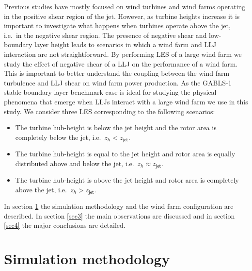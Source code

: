 \documentclass[%
 aip,
 amsmath,amssymb,
preprint,%
author-numerical,%
]{revtex4-1}
\begin{document}
Previous studies have mostly focused on wind turbines and wind farms operating in the positive shear region of the jet. However, as turbine heights increase it is important to investigate what happens when turbines operate above the jet, i.e.\ in the negative shear region. The presence of negative shear and low-boundary layer height leads to scenarios in which a wind farm and LLJ interaction are not straightforward. By performing LES of a large wind farm we study the effect of negative shear of a LLJ on the performance of a wind farm. This is important to better understand the coupling between the wind farm turbulence and LLJ shear on wind farm power production. As the GABLS-1 stable boundary layer benchmark case is ideal for studying the physical phenomena that emerge when LLJs interact with a large wind farm we use in this study. We consider three LES corresponding to the following scenarios:
\vspace{-2.5mm}
\begin{itemize}
\item[1.] The turbine hub-height is below the jet height and the rotor area is completely below the jet, i.e.\ $z_h < z_\mathsf{jet}$.
\vspace{-2.5mm}
\item[2.] The turbine hub-height is equal to the jet height and rotor area is equally distributed above and below the jet, i.e.\ $z_h \approx z_\mathsf{jet}$.
\vspace{-2.5mm}
\item[3.] The turbine hub-height is above the jet height and rotor area is completely above the jet, i.e.\ $z_h > z_\mathsf{jet}$.
\end{itemize}
In section \ref{sec2} the simulation methodology and the wind farm configuration are described. In section \ref{sec3} the main observations are discussed and in section \ref{sec4} the major conclusions are detailed. 

\section{Simulation methodology}\label{sec2}
\end{document}
